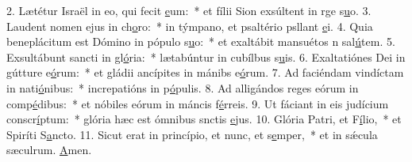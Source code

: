 2. Lætétur Israël in eo, qui fecit \uline{e}um:~* et fílii Sion exsúltent in rge s\uline{u}o.
3. Laudent nomen ejus in ch\uline{o}ro:~* in týmpano, et psaltério psllant \uline{e}i.
4. Quia beneplácitum est Dómino in pópulo s\uline{u}o:~* et exaltábit mansuétos n sal\uline{ú}tem.
5. Exsultábunt sancti in gl\uline{ó}ria:~* lætabúntur in cubílbus s\uline{u}is.
6. Exaltatiónes Dei in gútture e\uline{ó}rum:~* et gládii ancípites in mánibs e\uline{ó}rum.
7. Ad faciéndam vindíctam in nati\uline{ó}nibus:~* increpatións in p\uline{ó}pulis.
8. Ad alligándos reges eórum in comp\uline{é}dibus:~* et nóbiles eórum in máncis f\uline{é}rreis.
9. Ut fáciant in eis judícium conscr\uline{í}ptum:~* glória hæc est ómnibus snctis \uline{e}jus.
10. Glória Patri, et F\uline{í}lio,~* et Spiríti S\uline{a}ncto.
11. Sicut erat in princípio, et nunc, et s\uline{e}mper,~* et in sǽcula sæculrum. \uline{A}men.

